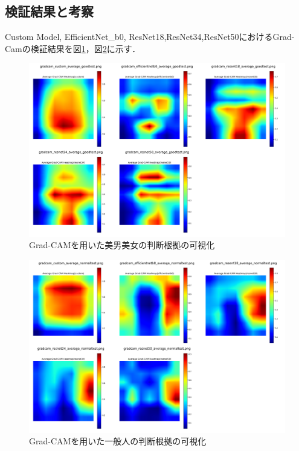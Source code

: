 \documentclass[a4paper,11pt,titlepage]{jsarticle}
\begin{document}
\subsection{検証結果と考察}
Custom Model, EfficientNet\_b0, ResNet18,ResNet34,ResNet50におけるGrad-Camの検証結果を図\ref{fig:gradcam_good}，図\ref{fig:gradcam_normal}に示す．\par
\begin{figure}[H]
    \centering
    \includegraphics[width=1.0\textwidth]{combined_images_good.png}
    \caption{Grad-CAMを用いた美男美女の判断根拠の可視化}
    \label{fig:gradcam_good}
\end{figure}
\begin{figure}[H]
    \centering
    \includegraphics[width=1.0\textwidth]{combined_images_normal.png}
    \caption{Grad-CAMを用いた一般人の判断根拠の可視化}
    \label{fig:gradcam_normal}
\end{figure}
\end{document}
